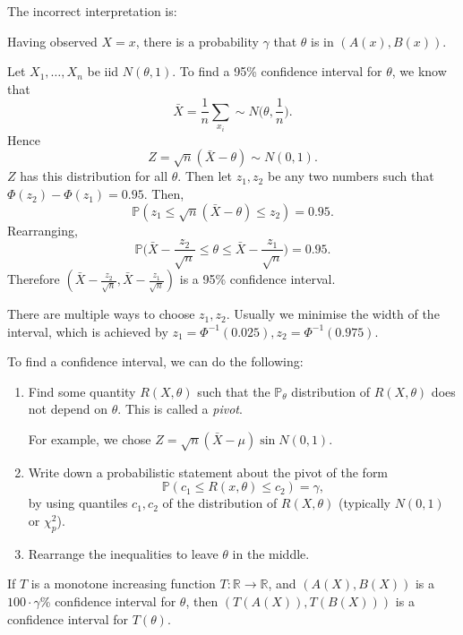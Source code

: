 \documentclass[12pt]{article}
\begin{document}
The incorrect interpretation is:
\begin{center}
	Having observed $X = x$, there is a probability $\gamma$ that $\theta$ is in $(A(x), B(x))$.
\end{center}

\begin{exbox}
	Let $X_1, \ldots, X_n$ be iid $N(\theta, 1)$. To find a 95\% confidence interval for $\theta$, we know that
	\[
	\bar X = \frac{1}{n} \sum_{x_i} \sim N\biggl(\theta, \frac{1}{n} \biggr)
	.\]
	Hence
	\[
		Z = \sqrt{n}(\bar X - \theta) \sim N(0,1)
	.\]
	$Z$ has this distribution for all $\theta$. Then let $z_1, z_2$ be any two numbers such that $\Phi(z_2) - \Phi(z_1) = 0.95$. Then,
	\[
	\mathbb{P}(z_1 \leq \sqrt n (\bar X - \theta) \leq z_2) = 0.95
	.\]
	Rearranging,
	\[
	\mathbb{P}\biggl( \bar X - \frac{z_2}{\sqrt n} \leq \theta \leq \bar X - \frac{z_1}{\sqrt n} \biggr) = 0.95
	.\]
	Therefore $(\bar X - \frac{z_2}{\sqrt{n}}, \bar X - \frac{z_1}{\sqrt n})$ is a 95\% confidence interval.

	There are multiple ways to choose $z_1, z_2$. Usually we minimise the width of the interval, which is achieved by $z_1 = \Phi^{-1} (0.025), z_2 = \Phi^{-1}(0.975)$.
\end{exbox}

To find a confidence interval, we can do the following:
\begin{enumerate}
	\item Find some quantity $R(X, \theta)$ such that the $\mathbb{P}_{\theta}$ distribution of $R(X,\theta)$ does not depend on $\theta$. This is called a \emph{pivot}.

		For example, we chose $Z = \sqrt n (\bar X - \mu) \sin N(0,1)$.
	\item Write down a probabilistic statement about the pivot of the form
		\[
		\mathbb{P}(c_1 \leq R(x, \theta) \leq c_2) = \gamma
		,\]
		by using quantiles $c_1, c_2$ of the distribution of $R(X,\theta)$ (typically $N(0,1)$ or $\chi^2_{p}$).
	\item Rearrange the inequalities to leave $\theta$ in the middle.
\end{enumerate}

\begin{proposition}
	If $T$ is a monotone increasing function $T : \mathbb{R} \to \mathbb{R}$, and $(A(X), B(X))$ is a $100 \cdot \gamma$\% confidence interval for $\theta$, then $(T(A(X)), T(B(X)))$ is a confidence interval for $T(\theta)$.
\end{proposition}
\end{document}
